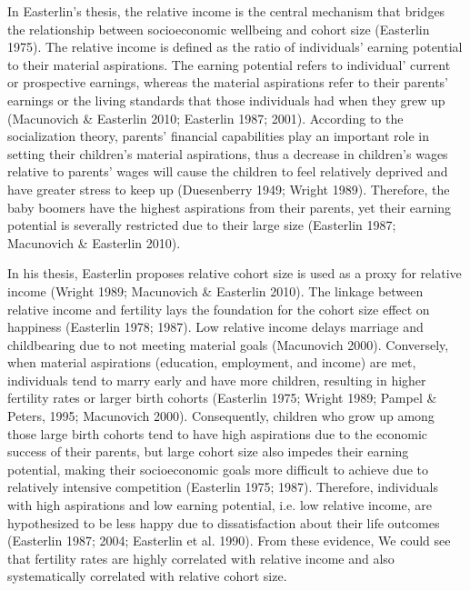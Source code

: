 In Easterlin’s thesis, the relative income is the central mechanism that bridges the relationship between socioeconomic wellbeing and cohort size (Easterlin 1975). The relative income is defined as the ratio of individuals’ earning potential to their material aspirations. The earning potential refers to individual’ current or prospective earnings, whereas the material aspirations refer to their parents’ earnings or the living standards that those individuals had when they grew up (Macunovich & Easterlin 2010; Easterlin 1987; 2001). According to the socialization theory, parents’ financial capabilities play an important role in setting their children’s material aspirations, thus a decrease in children’s wages relative to parents’ wages will cause the children to feel relatively deprived and have greater stress to keep up (Duesenberry 1949; Wright 1989). Therefore, the baby boomers have the highest aspirations from their parents, yet their earning potential is severally restricted due to their large size (Easterlin 1987; Macunovich & Easterlin 2010).

In his thesis, Easterlin proposes relative cohort size is used as a proxy for relative income (Wright 1989; Macunovich & Easterlin 2010). The linkage between relative income and fertility lays the foundation for the cohort size effect on happiness (Easterlin 1978; 1987). Low relative income delays marriage and childbearing due to not meeting material goals (Macunovich 2000). Conversely, when material aspirations (education, employment, and income) are met, individuals tend to marry early and have more children, resulting in higher fertility rates or larger birth cohorts (Easterlin 1975; Wright 1989; Pampel & Peters, 1995; Macunovich 2000). Consequently, children who grow up among those large birth cohorts tend to have high aspirations due to the economic success of their parents, but large cohort size also impedes their earning potential, making their socioeconomic goals more difficult to achieve due to relatively intensive competition (Easterlin 1975; 1987). Therefore, individuals with high aspirations and low earning potential, i.e. low relative income, are hypothesized to be less happy due to dissatisfaction about their life outcomes (Easterlin 1987; 2004; Easterlin et al. 1990). From these evidence, We could see that fertility rates are highly correlated with relative income and also systematically correlated with relative cohort size. 

